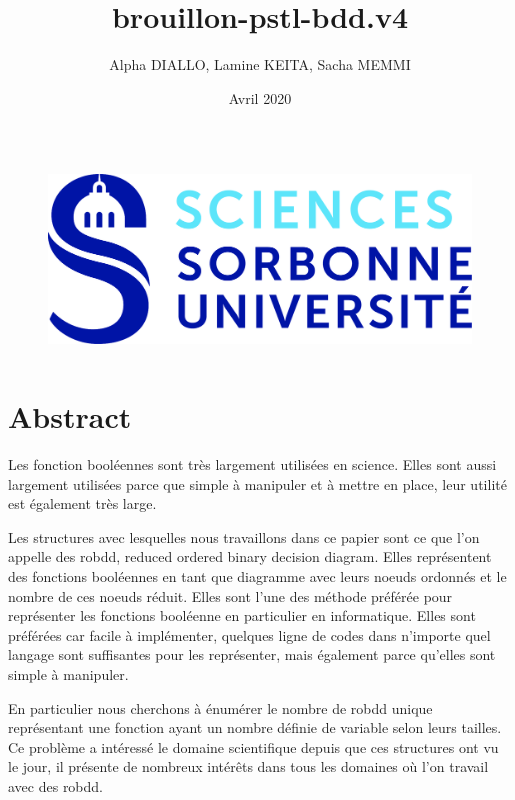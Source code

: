 \documentclass[french]{article}
\title{brouillon-pstl-bdd.v4}
\author{Alpha DIALLO, Lamine KEITA, Sacha MEMMI}
\date{Avril 2020}
\begin{document}
\maketitle
\begin{figure}[htp]
    \centering
    \includegraphics[width=12cm, height=5cm]{logo_upmc}
    \label{fig:logo}
\end{figure}


\newpage
\tableofcontents
\newpage
\section{Abstract}


Les fonction booléennes sont très largement utilisées en science. Elles sont aussi largement utilisées parce que simple à manipuler et à mettre en place, leur utilité est également très large. 
\vspace{5mm} %

Les structures avec lesquelles nous travaillons dans ce papier sont ce que l'on appelle des robdd, reduced ordered binary decision diagram. Elles représentent des fonctions booléennes en tant que diagramme avec leurs noeuds ordonnés et le nombre de ces noeuds réduit. Elles sont l'une des méthode préférée pour représenter les fonctions booléenne en particulier en informatique. Elles sont préférées car facile à implémenter, quelques ligne de codes dans n'importe quel langage sont suffisantes pour les représenter, mais également parce qu'elles sont simple à manipuler.
\vspace{5mm} %

En particulier nous cherchons à énumérer le nombre de robdd unique représentant une fonction ayant un nombre définie de variable selon leurs tailles. Ce problème a intéressé le domaine scientifique depuis que ces structures ont vu le jour, il présente de nombreux intérêts dans tous les domaines où l'on travail avec des robdd.
\vspace{5mm} %
\end{document}
